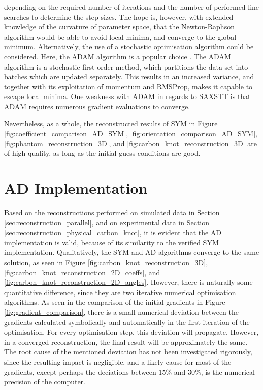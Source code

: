 depending on the required number of iterations and the number of performed line searches to determine the step sizes.
The hope is, however, with extended knowledge of the curvature of parameter space, that the Newton-Raphson algorithm would be able to avoid local minima, and converge to the global minimum.
Alternatively, the use of a stochastic optimisation algorithm could be considered. Here, the ADAM algorithm is a popular choice \cite{}. %
The ADAM algorithm is a stochastic first order method, which partitions the data set into batches which are updated separately.
This results in an increased variance, and together with its exploitation of momentum and RMSProp, makes it capable to escape local minima.
One weakness with ADAM in regards to SAXSTT is that ADAM requires numerous gradient evaluations to converge.

Nevertheless, as a whole, the reconstructed results of SYM in
Figure \ref{fig:coefficient_comparison_AD_SYM},
\ref{fig:orientation_comparison_AD_SYM},
\ref{fig:phantom_reconstruction_3D}, and
\ref{fig:carbon_knot_reconstruction_3D} are of high quality, as long as the initial guess conditions are good.




\section{AD Implementation}\label{sec:ad_validation}
Based on the reconstructions performed on simulated data in Section \ref{sec:reconstruction_parallel},
and on experimental data in Section \ref{sec:reconstruction_physical_carbon_knot},
it is evident that the AD implementation is valid, because of its similarity to the verified SYM implementation.
Qualitatively, the SYM and AD algorithms converge to the same solution, as seen in Figure \ref{fig:carbon_knot_reconstruction_3D}, \ref{fig:carbon_knot_reconstruction_2D_coeffs}, and \ref{fig:carbon_knot_reconstruction_2D_angles}.
However, there is naturally some quantitative difference, since they are two iterative numerical optimisation algorithms.
As seen in the comparison of the initial gradients in Figure \ref{fig:gradient_comparison},
there is a small numerical deviation between the gradients calculated symbolically and automatically in the first iteration of the optimisation.
For every optimisation step, this deviation will propagate. However, in a converged reconstruction,
the final result will be approximately the same.
The root cause of the mentioned deviation has not been investigated rigorously, since the resulting impact is negligible,
and a likely cause for most of the gradients, except perhaps the deciations between $15\%$ and $30\%$, is the numerical precision of the computer.


